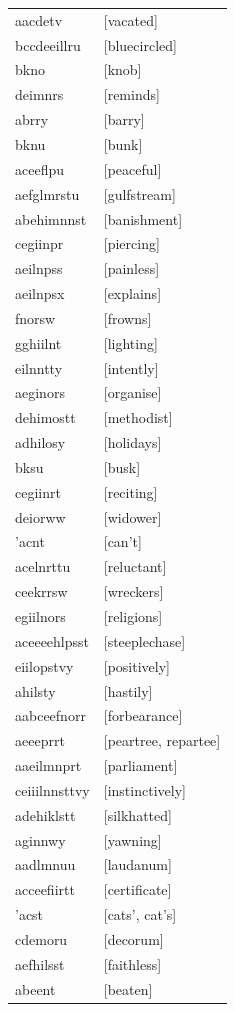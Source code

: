 \documentclass{article}
\begin{document}
\begin{tabular}{ll}
aacdetv & [vacated] \\
bccdeeillru & [bluecircled] \\
bkno & [knob] \\
deimnrs & [reminds] \\
abrry & [barry] \\
bknu & [bunk] \\
aceeflpu & [peaceful] \\
aefglmrstu & [gulfstream] \\
abehimnnst & [banishment] \\
cegiinpr & [piercing] \\
aeilnpss & [painless] \\
aeilnpsx & [explains] \\
fnorsw & [frowns] \\
gghiilnt & [lighting] \\
eilnntty & [intently] \\
aeginors & [organise] \\
dehimostt & [methodist] \\
adhilosy & [holidays] \\
bksu & [busk] \\
cegiinrt & [reciting] \\
deiorww & [widower] \\
'acnt & [can't] \\
acelnrttu & [reluctant] \\
ceekrrsw & [wreckers] \\
egiilnors & [religions] \\
aceeeehlpsst & [steeplechase] \\
eiilopstvy & [positively] \\
ahilsty & [hastily] \\
aabceefnorr & [forbearance] \\
aeeeprrt & [peartree, repartee] \\
aaeilmnprt & [parliament] \\
ceiiilnnsttvy & [instinctively] \\
adehiklstt & [silkhatted] \\
aginnwy & [yawning] \\
aadlmnuu & [laudanum] \\
acceefiirtt & [certificate] \\
'acst & [cats', cat's] \\
cdemoru & [decorum] \\
aefhilsst & [faithless] \\
abeent & [beaten] \\

\end{tabular}
\end{document}
